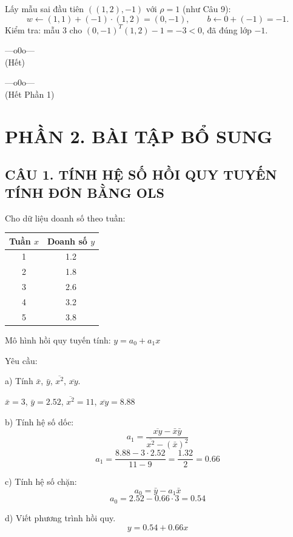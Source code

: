 \documentclass[a4paper,12pt]{article}
\begin{document}
Lấy mẫu sai đầu tiên $((1,2), -1)$ với $\rho = 1$ (như Câu 9):
\[ w \leftarrow (1,1) + (-1)\cdot(1,2) = (0,-1), \qquad b \leftarrow 0 + (-1) = -1. \]
Kiểm tra: mẫu 3 cho $(0,-1)^T(1,2) - 1 = -3 < 0$, đã đúng lớp $-1$.

\begin{center}
---o0o--- \\[0.3cm]
(Hết)
\end{center}

\begin{center}
---o0o--- \\[0.3cm]
(Hết Phần 1)
\end{center}

\newpage
\section*{PHẦN 2. BÀI TẬP BỔ SUNG}

\subsection*{CÂU 1. TÍNH HỆ SỐ HỒI QUY TUYẾN TÍNH ĐƠN BẰNG OLS}

Cho dữ liệu doanh số theo tuần:
\begin{center}
\begin{tabular}{|c|c|}
\hline
Tuần $x$ & Doanh số $y$ \\
\hline
1 & 1.2 \\
2 & 1.8 \\
3 & 2.6 \\
4 & 3.2 \\
5 & 3.8 \\
\hline
\end{tabular}
\end{center}

Mô hình hồi quy tuyến tính: $y = a_0 + a_1 x$

Yêu cầu:

a) Tính $\bar{x}$, $\bar{y}$, $\overline{x^2}$, $\overline{xy}$.

$\bar{x} = 3$, $\bar{y} = 2.52$, $\overline{x^2} = 11$, $\overline{xy} = 8.88$

b) Tính hệ số dốc:
\[ a_1 = \frac{\overline{xy} - \bar{x}\bar{y}}{\overline{x^2} - (\bar{x})^2} \]
\[ a_1 = \frac{8.88 - 3 \cdot 2.52}{11 - 9} = \frac{1.32}{2} = 0.66 \]

c) Tính hệ số chặn:
\[ a_0 = \bar{y} - a_1 \bar{x} \]
\[ a_0 = 2.52 - 0.66 \cdot 3 = 0.54 \]

d) Viết phương trình hồi quy.
\[ y = 0.54 + 0.66x \]
\end{document}
